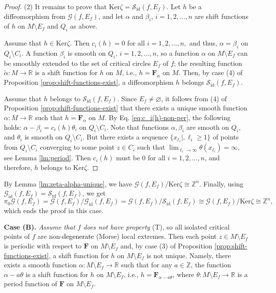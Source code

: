 \documentclass[10pt,reqno]{amsart}
\newcommand{\bbR}{\mathbb{R}}
\newcommand{\bbZ}{\mathbb{Z}}
\newcommand{\bfF}{\mathbf{F}}
\newcommand{\id}{\mathrm{id}}
\renewcommand{\ker}{\mathrm{Ker}}
\newcommand{\textr}[1]{\textcolor{black}{#1}}
\begin{document}
\begin{proof}
	(2) It remains to prove that $\ker\zeta = \mathcal{S}_{\id}(f,E_f)$.
	 Let $h$ be a diffeomorphism from $\mathcal{G}(f,E_f)$, and let $\alpha$ and $\beta_i$, $i = 1,2,\ldots, n$ are shift functions of $h$ on $M\setminus E_f$ and $Q_i$ as above. 

	Assume that $h\in \ker\zeta.$ Then $c_i(h) = 0$ for all $i = 1,2,\ldots, n,$ and thus, $\alpha = \beta_i$ on $Q_i\setminus C_i$. A function $\beta_i$ is smooth on $Q_i$, $i = 1,2,\ldots, n$, so a function $\alpha$ on $M\setminus E_f$ can be smoothly extended to the set of critical circles $E_f$ of $f$; the resulting function $\tilde{\alpha}:M\to \bbR$ is a shift function for $h$ on $M$, i.e.,  $h = \bfF_{\tilde{\alpha}}$ on $M$. Then, by case (4) of Proposition \ref{prop:shift-functions-exist}, a diffeomorphism $h$ belongs $\mathcal{S}_{\id}(f,E_f)$.
		
	Assume that $h$ belongs to $\mathcal{S}_{\id}(f,E_f)$. Since $E_f \neq\varnothing$, it follows from (4) of Proposition \ref{prop:shift-functions-exist} that there exists a unique smooth function $\alpha:M\to \bbR$ such that $h = \bfF_{\alpha}$ on $M$.  By Eq. \eqref{eq:c_i(h)-non-per}, the following holds:
	$\alpha-\beta_i = c_i(h)\theta_i$ on $Q_i\setminus C_i$. Note that functions $\alpha,\beta_i$ are smooth on $Q_i$, and $\theta_i$ is smooth on $Q_i\setminus C_i$. But there exists a sequence $\{x_{\ell_i}|, {\ell_i}\geq 1\}$ of points from $Q_i\setminus C_i$ converging to some point $z\in C_i$  such that  $\lim_{\ell_i\to \infty}\theta(x_{\ell_i}) = \infty$, see Lemma \ref{lm:period}. Then $c_i(h)$ must be $0$ for all $i = 1,2,\ldots, n$, and therefore, $h$ belongs to $\ker\zeta.$	 
\end{proof}
By Lemma \ref{lm:zeta-alpha-unique}, we have $\mathcal{G}(f,E_f)/\ker \zeta\cong \bbZ^n$.
Finally,  using $\mathcal{G}_{\id}(f,E_f) = \mathcal{S}_{\id}(f,E_f)$, we get
$$
 \pi_0\mathcal{G}(f,E_f) =  \mathcal{G}(f,E_f)/\mathcal{G}_{\id}(f, E_f)  = \mathcal{G}(f, E_f)/\mathcal{S}_{\id}(f,E_f) \cong \mathcal{G}(f, E_f)/\ker\zeta\cong \bbZ^n,
$$
which ends the proof in this case.

{\bf Case (B).} {\it Assume that $f$ does not have property} (T), so all isolated critical points of $f$ are non-\textr{degenerate} (Morse) local extremes.
Then
each point $z\in M\setminus E_f$ is periodic with respect to $\bfF$ on $M\setminus E_f$ and,
 by case (3) of Proposition \ref{prop:shift-functions-exist},
a shift function for $h$ on $M\setminus E_f$ is not unique. Namely, 
there exists a smooth function $\alpha:M\setminus E_f\to \bbR$ such that for any $a\in \bbZ$, the function $\alpha-a\theta$ is a shift function for $h$ on $M\setminus E_f$, i.e., $h = \bfF_{\alpha-a\theta}$, where $\theta:M\setminus E_f\to \bbR$ is a period function of $\bfF$ on $M\setminus E_f$.
\end{document}
